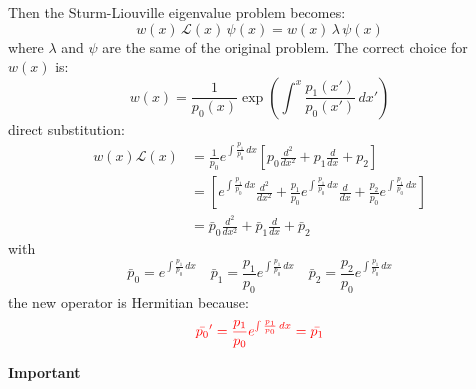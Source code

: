 \documentclass{article}
\begin{document}
\noindent
Then the Sturm-Liouville eigenvalue problem becomes:
\begin{equation}
    w(x)\, \mathcal{L}(x)\, \psi(x) = w(x)\, \lambda\, \psi(x)
\end{equation}
where $\lambda$ and $\psi$ are the same of the original problem. The correct choice for $w(x)$ is:
\begin{equation}
    w(x) = \frac{1}{p_0(x)} \exp\left( \int^x \frac{p_1(x')}{p_0(x')} \, dx' \right)
\end{equation}
direct substitution:
\begin{align*}
    w(x) \mathcal{L}(x) &= \frac{1}{p_0} e^{\int \frac{p_1}{p_0} \, dx}
\left[ 
p_0 \frac{d^2}{dx^2} + p_1 \frac{d}{dx} + p_2 
\right]\\
&= \left[
e^{\int \frac{p_1}{p_0} \, dx} \frac{d^2}{dx^2}
+ \frac{p_1}{p_0} e^{\int \frac{p_1}{p_0} \, dx} \frac{d}{dx}
+ \frac{p_2}{p_0} e^{\int \frac{p_1}{p_0} \, dx}
\right]\\
&= \bar{p}_0 \frac{d^2}{dx^2} + \bar{p}_1 \frac{d}{dx} + \bar{p}_2
\end{align*}
with
\begin{equation*}
    \bar{p}_0 = e^{\int \frac{p_1}{p_0} \, dx} \quad \bar{p}_1 = \frac{p_1}{p_0} e^{\int \frac{p_1}{p_0} \, dx} \quad \bar{p}_2 = \frac{p_2}{p_0}e^{\int \frac{p_1}{p_0} \, dx}
\end{equation*}
the new operator is Hermitian because:
\begin{equation}
    \color{red} \bar{p_0}' = \frac{p_1}{p_0}e^{\int \frac{p_1}{p_0} \, dx} = \bar{p_1} \color{black}
\end{equation}

\noindent
\textbf{Important}
\end{document}
